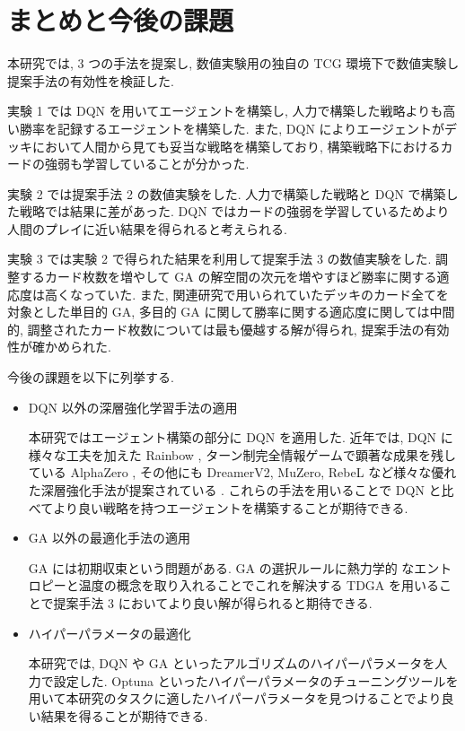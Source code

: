 \newpage
\changeindent{0cm}
\section{まとめと今後の課題}

本研究では, 3 つの手法を提案し, 数値実験用の独自の TCG 環境下で数値実験し提案手法の有効性を検証した.
\par
実験 1 では DQN を用いてエージェントを構築し, 人力で構築した戦略よりも高い勝率を記録するエージェントを構築した. また, DQN によりエージェントがデッキにおいて人間から見ても妥当な戦略を構築しており, 構築戦略下におけるカードの強弱も学習していることが分かった.
\par
実験 2 では提案手法 2 の数値実験をした. 人力で構築した戦略と DQN で構築した戦略では結果に差があった. DQN ではカードの強弱を学習しているためより人間のプレイに近い結果を得られると考えられる.
\par
実験 3 では実験 2 で得られた結果を利用して提案手法 3 の数値実験をした. 調整するカード枚数を増やして GA の解空間の次元を増やすほど勝率に関する適応度は高くなっていた. 
また, 関連研究で用いられていたデッキのカード全てを対象とした単目的 GA, 多目的 GA に関して勝率に関する適応度に関しては中間的, 調整されたカード枚数については最も優越する解が得られ, 提案手法の有効性が確かめられた.\par
今後の課題を以下に列挙する.
\begin{itemize}
  \small
  \setlength{\itemsep}{0cm} %
  \item DQN 以外の深層強化学習手法の適用
  \par
  本研究ではエージェント構築の部分に DQN を適用した. 近年では, DQN に様々な工夫を加えた Rainbow \cite{Rainbow}, ターン制完全情報ゲームで顕著な成果を残している AlphaZero , その他にも DreamerV2, MuZero, RebeL など様々な優れた深層強化手法が提案されている \cite{DreamerV2}\cite{MuZero}\cite{ReBeL}. これらの手法を用いることで DQN と比べてより良い戦略を持つエージェントを構築することが期待できる.
  \item GA 以外の最適化手法の適用\par
  GA には初期収束という問題がある. GA の選択ルールに熱力学的
  なエントロピーと温度の概念を取り入れることでこれを解決する TDGA \cite{TDGA} を用いることで提案手法 3 においてより良い解が得られると期待できる.
  \item ハイパーパラメータの最適化
  \par
  本研究では, DQN や GA といったアルゴリズムのハイパーパラメータを人力で設定した. Optuna \cite{Optuna} といったハイパーパラメータのチューニングツールを用いて本研究のタスクに適したハイパーパラメータを見つけることでより良い結果を得ることが期待できる.
\end{itemize}




\changeindent{2cm}